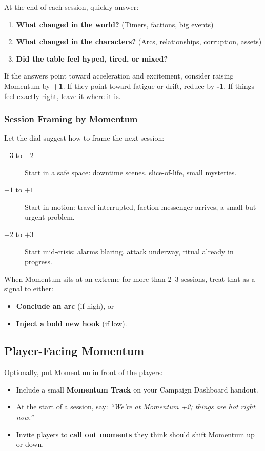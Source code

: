 \documentclass[11pt]{article}
\begin{document}
At the end of each session, quickly answer:

\begin{enumerate}
  \item \textbf{What changed in the world?} (Timers, factions, big events)
  \item \textbf{What changed in the characters?} (Arcs, relationships, corruption, assets)
  \item \textbf{Did the table feel hyped, tired, or mixed?}
\end{enumerate}

If the answers point toward acceleration and excitement, consider raising Momentum by \textbf{+1}. If they point toward fatigue or drift, reduce by \textbf{-1}. If things feel exactly right, leave it where it is.

\subsubsection{Session Framing by Momentum}

Let the dial suggest how to frame the next session:

\begin{description}
  \item[$-3$ to $-2$] Start in a safe space: downtime scenes, slice-of-life, small mysteries.
  \item[$-1$ to $+1$] Start in motion: travel interrupted, faction messenger arrives, a small but urgent problem.
  \item[$+2$ to $+3$] Start mid-crisis: alarms blaring, attack underway, ritual already in progress.
\end{description}

When Momentum sits at an extreme for more than 2--3 sessions, treat that as a signal to either:
\begin{itemize}
  \item \textbf{Conclude an arc} (if high), or
  \item \textbf{Inject a bold new hook} (if low).
\end{itemize}

\subsection{Player-Facing Momentum}

Optionally, put Momentum in front of the players:

\begin{itemize}
  \item Include a small \textbf{Momentum Track} on your Campaign Dashboard handout.
  \item At the start of a session, say: \emph{``We're at Momentum +2; things are hot right now.''}
  \item Invite players to \textbf{call out moments} they think should shift Momentum up or down.
\end{itemize}
\end{document}
